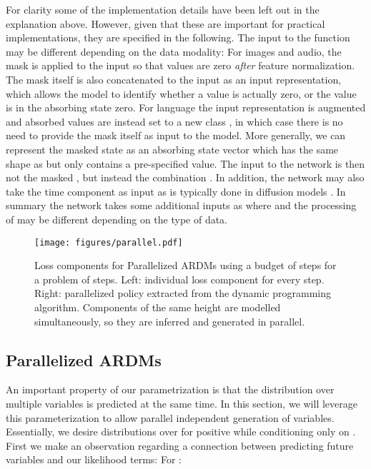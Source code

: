 \documentclass{article} \usepackage{iclr2022_conference,times}
\begin{document}
For clarity some of the implementation details have been left out in the explanation above. However, given that these are important for practical implementations, they are specified in the following. The input to the function  may be different depending on the data modality: For images and audio, the mask is applied to the input so that values are zero \textit{after} feature normalization. The mask itself is also concatenated to the input as an input representation, which allows the model to identify whether a value is actually zero, or the value is in the absorbing state zero. For language the input representation is augmented and absorbed values are instead set to a new class , in which case there is no need to provide the mask itself as input to the model. More generally, we can represent the masked state as an absorbing state vector  which has the same shape as  but only contains a pre-specified value. The input to the network is then not the masked , but instead the combination . In addition, the network  may also take the time component  as input as is typically done in diffusion models \citep{ho2020denoising}. In summary the network takes some additional inputs as  where  and the processing of  may be different depending on the type of data.

\begin{figure}[b]
    \vspace{-.1cm}
    \centering
    \texttt{[image: figures/parallel.pdf]}
    \vspace{-.2cm}
    \caption{Loss components for Parallelized ARDMs using a budget of  steps for a problem of  steps. Left: individual loss component for every step. Right: parallelized policy extracted from the dynamic programming algorithm. Components of the same height are modelled simultaneously, so they are inferred and generated in parallel.}
    \label{fig:parallel_l_t}
    \vspace{-.3cm}
\end{figure}

\subsection{Parallelized ARDMs}
An important property of our parametrization is that the distribution over multiple variables is predicted at the same time. In this section, we will leverage this parameterization to allow parallel independent generation of variables. Essentially, we desire distributions over  for positive  while conditioning only on . First we make an observation regarding a connection between predicting future variables and our likelihood terms: For :
\end{document}
